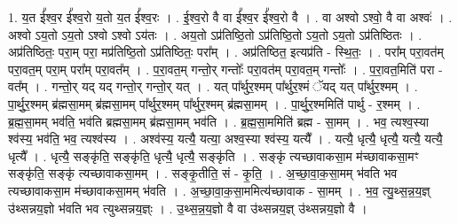 \documentclass[17pt]{extarticle}
\begin{document}
1. य॒त ई᳚श्व॒र ई᳚श्व॒रो य॒तो य॒त ई᳚श्व॒रः । . ई॒श्व॒रो वै वा ई᳚श्व॒र ई᳚श्व॒रो वै । . वा अश्वो ऽश्वो॒ वै वा अश्वः॑ । . अश्वो ऽय॒तो ऽय॒तो ऽश्वो ऽश्वो ऽय॑तः । . अय॒तो ऽप्र॑तिष्ठि॒तो ऽप्र॑तिष्ठि॒तो ऽय॒तो ऽय॒तो ऽप्र॑तिष्ठितः । . अप्र॑तिष्ठितः॒ परा॒म् परा॒ मप्र॑तिष्ठि॒तो ऽप्र॑तिष्ठितः॒ परा᳚म् । . अप्र॑तिष्ठित॒ इत्यप्र॑ति - स्थि॒तः॒ । . परा᳚म् परा॒वत॑म् परा॒वत॒म् परा॒म् परा᳚म् परा॒वत᳚म् । . प॒रा॒वत॒म् गन्तो॒र् गन्तोः᳚ परा॒वत॑म् परा॒वत॒म् गन्तोः᳚ । . प॒रा॒वत॒मिति॑ परा - वत᳚म् । . गन्तो॒र् यद् यद् गन्तो॒र् गन्तो॒र् यत् । . यत् पा᳚र्थुर॒श्मम् पा᳚र्थुर॒श्मं ॅयद् यत् पा᳚र्थुर॒श्मम् । . पा॒र्थु॒र॒श्मम् ब्र॑ह्मसा॒मम् ब्र॑ह्मसा॒मम् पा᳚र्थुर॒श्मम् पा᳚र्थुर॒श्मम् ब्र॑ह्मसा॒मम् । . पा॒र्थु॒र॒श्ममिति॑ पार्थु - र॒श्मम् । . ब्र॒ह्म॒सा॒मम् भव॑ति॒ भव॑ति ब्रह्मसा॒मम् ब्र॑ह्मसा॒मम् भव॑ति । . ब्र॒ह्म॒सा॒ममिति॑ ब्रह्म - सा॒मम् । . भव॒ त्यश्व॒स्या श्व॑स्य॒ भव॑ति॒ भव॒ त्यश्व॑स्य । . अश्व॑स्य॒ यत्यै॒ यत्या॒ अश्व॒स्या श्व॑स्य॒ यत्यै᳚ । . यत्यै॒ धृत्यै॒ धृत्यै॒ यत्यै॒ यत्यै॒ धृत्यै᳚ । . धृत्यै॒ सङ्कृ॑ति॒ सङ्कृ॑ति॒ धृत्यै॒ धृत्यै॒ सङ्कृ॑ति । . सङ्कृ॑ त्यच्छावाकसा॒म म॑च्छावाकसा॒मꣳ सङ्कृ॑ति॒ सङ्कृ॑ त्यच्छावाकसा॒मम् । . सङ्कृ॒तीति॒ सं - कृ॒ति॒ । . अ॒च्छा॒वा॒क॒सा॒मम् भ॑वति भव त्यच्छावाकसा॒म म॑च्छावाकसा॒मम् भ॑वति । . अ॒च्छा॒वा॒क॒सा॒ममित्य॑च्छावाक - सा॒मम् । . भ॒व॒ त्यु॒थ्स॒न्न॒य॒ज्ञ् उ॑थ्सन्नय॒ज्ञो भ॑वति भव त्युथ्सन्नय॒ज्ञ्ः । . उ॒थ्स॒न्न॒य॒ज्ञो वै वा उ॑थ्सन्नय॒ज्ञ् उ॑थ्सन्नय॒ज्ञो वै । \newline
\end{document}
